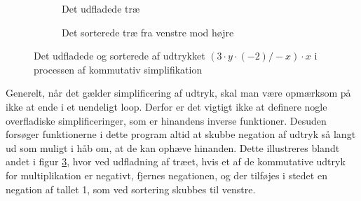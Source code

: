 \begin{figure}[H]
  \centering
  \begin{subfigure}[b]{0.45\textwidth}
    \centering
    \caption{Det udfladede træ}
    \label{fig:sub1}
  \end{subfigure}
  \hfill
  \begin{subfigure}[b]{0.45\textwidth}
    \centering
    \caption{Det sorterede træ fra venstre mod højre}
    \label{fig:sub2}
  \end{subfigure}
  \caption{Det udfladede og sorterede af udtrykket $(3 \cdot y \cdot (-2)/-x) \cdot x$ i processen af kommutativ simplifikation}
  \label{fig:trees}
\end{figure}

Generelt, når det gælder simplificering af udtryk, skal man være opmærksom på ikke at ende i et uendeligt loop. Derfor er det vigtigt ikke at definere nogle overfladiske simplificeringer, som er hinandens inverse funktioner. Desuden forsøger funktionerne i dette program altid at skubbe negation af udtryk så langt ud som muligt i håb om, at de kan ophæve hinanden. Dette illustreres blandt andet i figur \ref{fig:trees}, hvor ved udfladning af træet, hvis et af de kommutative udtryk for multiplikation er negativt, fjernes negationen, og der tilføjes i stedet en negation af tallet 1, som ved sortering skubbes til venstre.


